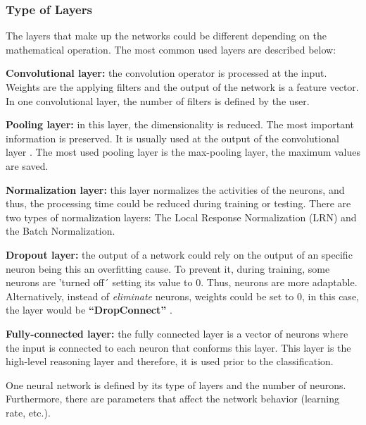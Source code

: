 \subsubsection{Type of Layers}
The layers that make up the networks could be different depending on the mathematical operation. The most common used layers are described below:
\begin{description}[itemsep=2pt,topsep=8pt,parsep=0pt,partopsep=20pt]
	\item \textbf{Convolutional layer:} the convolution operator is processed at the input. Weights are the applying filters and the output of the network is a feature vector. In one convolutional layer, the number of filters is defined by the user.
	\item \textbf{Pooling layer:} in this layer, the dimensionality is reduced. The most important information is preserved. It is usually used at the output of the convolutional layer \cite{Doorn}. The most used pooling layer is the max-pooling layer, the maximum values are saved.
	\item \textbf{Normalization layer:} this layer normalizes the activities of the neurons, and thus, the processing time could be reduced during training or testing. There are two types of normalization layers: The Local Response Normalization (LRN) and the Batch Normalization.
	\item \textbf{Dropout layer:} the output of a network could rely on the output of an specific neuron being this an overfitting cause. To prevent it, during training, some neurons are 'turned off´ setting its value to 0. Thus, neurons are more adaptable. Alternatively, instead of \textit{eliminate} neurons,  weights could be set to 0, in this case, the layer would be \textbf{``DropConnect''} \cite{Doorn}.
\item  \textbf{Fully-connected layer:} the fully connected layer is a vector of neurons where the input is connected to each neuron that conforms this layer. This layer is the high-level reasoning layer and therefore, it is used prior to the classification.
\end{description}

One neural network is defined by its type of layers and the number of neurons. Furthermore, there are parameters that affect the network behavior (learning rate, etc.)\cite{Lecum2}.

